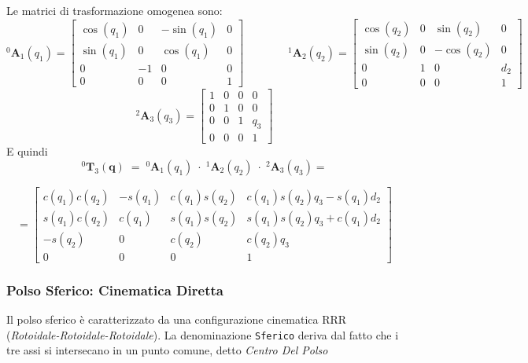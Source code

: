 \documentclass[11pt, a4paper]{report}
\begin{document}
Le matrici di trasformazione omogenea sono:
\[
    ^{0}\bm{A}_{1}(q_{1}) =
    \begin{bmatrix}
        \cos(q_{1}) & 0 & -\sin(q_{1}) & 0\\
        \sin(q_{1}) & 0 & \cos(q_{1}) & 0\\
        0 & -1 & 0 & 0\\
        0 & 0 & 0 & 1
    \end{bmatrix}
    \qquad\qquad
    ^{1}\bm{A}_{2}(q_{2}) =
    \begin{bmatrix}
        \cos(q_{2}) & 0 & \sin(q_{2}) & 0\\
        \sin(q_{2}) & 0 & -\cos(q_{2}) & 0\\
        0 & 1 & 0 & d_{2}\\
        0 & 0 & 0 & 1
    \end{bmatrix}
\]
\[
    ^{2}\bm{A}_{3}(q_{3}) =
    \begin{bmatrix}
        1 & 0 & 0 & 0\\
        0 & 1 & 0 & 0\\
        0 & 0 & 1 & q_{3}\\
        0 & 0 & 0 & 1
    \end{bmatrix}
\]
E quindi
\[
    ^{0}\bm{T}_{3}(\textbf{q}) \; = \; ^{0}\bm{A}_{1}(q_{1}) \; \cdot \; ^{1}\bm{A}_{2}(q_{2}) \; \cdot \; ^{2}\bm{A}_{3}(q_{3}) =
\]

\[
    =
    \begin{bmatrix}
        c(q_{1})c(q_{2}) & -s(q_{1}) & c(q_{1})s(q_{2}) & c(q_{1})s(q_{2})q_{3} - s(q_{1})d_{2} \\
        s(q_{1})c(q_{2}) & c(q_{1}) & s(q_{1})s(q_{2}) & s(q_{1})s(q_{2})q_{3} + c(q_{1})d_{2}\\
        -s(q_{2}) & 0 & c(q_{2}) & c(q_{2})q_{3}\\
        0 & 0 & 0 & 1
    \end{bmatrix}
\]
\newpage
\subsubsection{Polso Sferico: Cinematica Diretta}
Il polso sferico è caratterizzato da una configurazione cinematica RRR (\textit{Rotoidale-Rotoidale-Rotoidale}). La denominazione \texttt{Sferico} deriva dal fatto che i tre assi si intersecano in un punto comune, detto \textit{Centro Del Polso}
\end{document}
